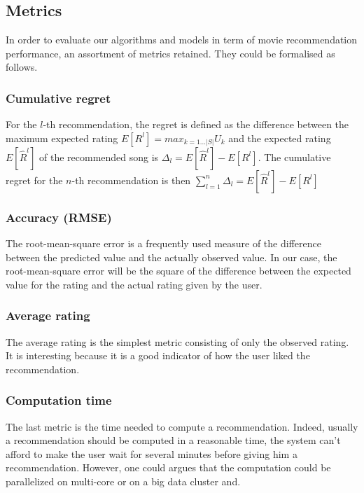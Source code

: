 \documentclass[letterpaper]{article}
\begin{document}
\subsection{Metrics} \label{metrics}

In order to evaluate our algorithms and models in term of movie recommendation performance, an assortment of metrics retained. They could be formalised as follows.

\subsubsection{Cumulative regret}

For the $l$-th recommendation, the regret is defined as the difference between the maximum expected rating $ E[R^{l}] = max_{k=1...|S|} U_{k} $  and the expected rating $E[\hat R^{l}]$ of the recommended song is  $\Delta_{l} = E[\hat{R} ^{l}] - E[R^{l}]$. The cumulative regret for the $n$-th recommendation is then $ \sum_{l=1}^{n} \Delta_{l} = E[\hat{R} ^{l}] - E[R^{l}]$

\subsubsection{Accuracy (RMSE)}

The root-mean-square error is a frequently used measure of the difference between the predicted value and the actually observed value. In our case, the root-mean-square error will be the square of the difference between the expected value for the rating and the actual rating given by the user.

\subsubsection{Average rating}

The average rating is the simplest metric consisting of only the observed rating. It is interesting because it is a good indicator of how the user liked the recommendation.

\subsubsection{Computation time}

The last metric is the time needed to compute a recommendation. Indeed, usually a recommendation should be computed in a reasonable time, the system can't afford to make the user wait for several minutes before giving him a recommendation. However, one could argues that the computation could be parallelized on multi-core or on a big data cluster and.  
\end{document}
